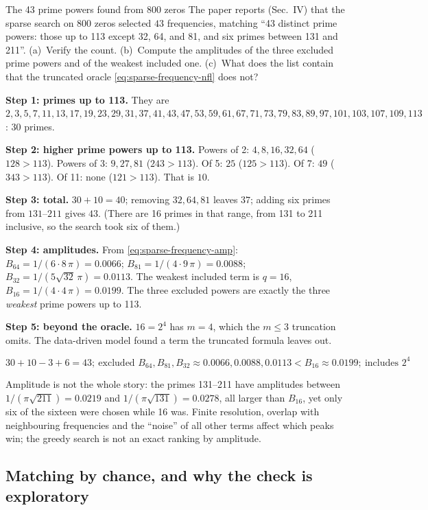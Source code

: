 \begin{sample}{The 43 prime powers found from 800 zeros}
The paper reports (Sec.~IV) that the sparse search on 800 zeros selected $43$ frequencies, matching ``43 distinct prime powers: those up to 113 except 32, 64, and 81, and six primes between 131 and 211''. (a)~Verify the count. (b)~Compute the amplitudes of the three excluded prime powers and of the weakest included one. (c)~What does the list contain that the truncated oracle \eqref{eq:sparse-frequency-nfl} does not?

\textbf{Step 1: primes up to 113.} They are $2,3,5,7,11,13,17,19,23,29,31,37,41,43,47,53,59,61,67,71,73,79,83,89,97,101,103,107,109,113$: $30$ primes.

\textbf{Step 2: higher prime powers up to 113.} Powers of 2: $4,8,16,32,64$ ($128>113$). Powers of 3: $9,27,81$ ($243>113$). Of 5: $25$ ($125>113$). Of 7: $49$ ($343>113$). Of 11: none ($121>113$). That is $10$.

\textbf{Step 3: total.} $30+10=40$; removing $32,64,81$ leaves $37$; adding six primes from $131$--$211$ gives $43$. (There are 16 primes in that range, from 131 to 211 inclusive, so the search took six of them.)

\textbf{Step 4: amplitudes.} From \eqref{eq:sparse-frequency-amp}: $B_{64}=1/(6\cdot8\,\pi)=0.0066$; $B_{81}=1/(4\cdot9\,\pi)=0.0088$; $B_{32}=1/(5\sqrt{32}\,\pi)=0.0113$. The weakest included term is $q=16$, $B_{16}=1/(4\cdot4\,\pi)=0.0199$. The three excluded powers are exactly the three \emph{weakest} prime powers up to 113.

\textbf{Step 5: beyond the oracle.} $16=2^4$ has $m=4$, which the $m\le3$ truncation omits. The data-driven model found a term the truncated formula leaves out.

$$\boxed{30+10-3+6=43;\ \text{excluded }B_{64},B_{81},B_{32}\approx0.0066,0.0088,0.0113<B_{16}\approx0.0199;\ \text{includes }2^4}$$
\end{sample}

Amplitude is not the whole story: the primes 131--211 have amplitudes between $1/(\pi\sqrt{211})=0.0219$ and $1/(\pi\sqrt{131})=0.0278$, all larger than $B_{16}$, yet only six of the sixteen were chosen while 16 was. Finite resolution, overlap with neighbouring frequencies and the ``noise'' of all other terms affect which peaks win; the greedy search is not an exact ranking by amplitude.

\subsection{Matching by chance, and why the check is exploratory}

